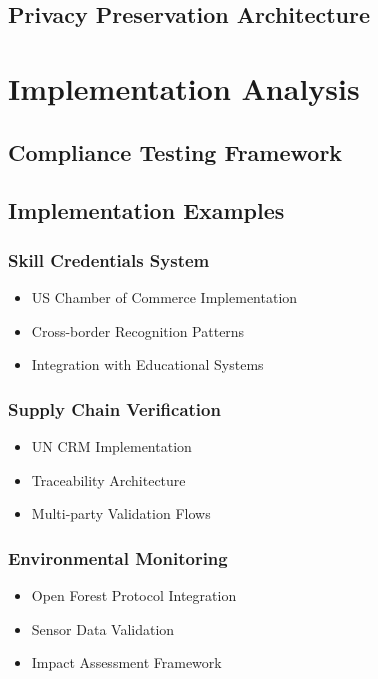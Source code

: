 \documentclass[11pt]{article}
\begin{document}
\subsection{Privacy Preservation Architecture}

\section{Implementation Analysis}
\subsection{Compliance Testing Framework}
\subsection{Implementation Examples}
\subsubsection{Skill Credentials System}
\begin{itemize}
    \item US Chamber of Commerce Implementation
    \item Cross-border Recognition Patterns
    \item Integration with Educational Systems
\end{itemize}

\subsubsection{Supply Chain Verification}
\begin{itemize}
    \item UN CRM Implementation
    \item Traceability Architecture
    \item Multi-party Validation Flows
\end{itemize}

\subsubsection{Environmental Monitoring}
\begin{itemize}
    \item Open Forest Protocol Integration
    \item Sensor Data Validation
    \item Impact Assessment Framework
\end{itemize}
\end{document}
